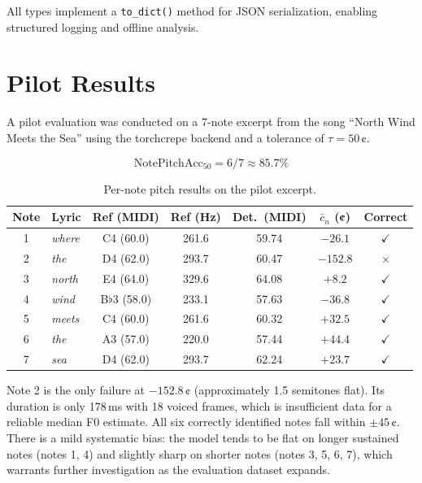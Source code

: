 \documentclass[11pt,letterpaper]{article}
\begin{document}
All types implement a \texttt{to\_dict()} method for JSON serialization,
enabling structured logging and offline analysis.

\section{Pilot Results}

A pilot evaluation was conducted on a 7-note excerpt from the song
``North Wind Meets the Sea'' using the torchcrepe backend and a
tolerance of $\tau = 50$\,¢.

\[
  \mathrm{NotePitchAcc}_{50} = 6/7 \approx 85.7\%
\]

\begin{table}[h]
  \centering
  \caption{Per-note pitch results on the pilot excerpt.}
  \renewcommand{\arraystretch}{1.2}
  \begin{tabular}{@{}clccccc@{}}
    \toprule
    Note & Lyric & Ref (MIDI) & Ref (Hz) & Det.\ (MIDI) & $\bar{c}_n$ (¢) & Correct \\
    \midrule
    1 & \textit{where} & C4 (60.0)  & 261.6 & 59.74 & $-26.1$  & $\checkmark$ \\
    2 & \textit{the}   & D4 (62.0)  & 293.7 & 60.47 & $-152.8$ & $\times$     \\
    3 & \textit{north} & E4 (64.0)  & 329.6 & 64.08 & $+8.2$   & $\checkmark$ \\
    4 & \textit{wind}  & B$\flat$3 (58.0) & 233.1 & 57.63 & $-36.8$ & $\checkmark$ \\
    5 & \textit{meets} & C4 (60.0)  & 261.6 & 60.32 & $+32.5$  & $\checkmark$ \\
    6 & \textit{the}   & A3 (57.0)  & 220.0 & 57.44 & $+44.4$  & $\checkmark$ \\
    7 & \textit{sea}   & D4 (62.0)  & 293.7 & 62.24 & $+23.7$  & $\checkmark$ \\
    \bottomrule
  \end{tabular}
\end{table}

Note 2 is the only failure at $-152.8$\,¢ (approximately 1.5 semitones flat).
Its duration is only 178\,ms with 18 voiced frames, which is insufficient
data for a reliable median F0 estimate.
All six correctly identified notes fall within $\pm 45$\,¢.
There is a mild systematic bias: the model tends to be flat on longer
sustained notes (notes 1, 4) and slightly sharp on shorter notes (notes 3,
5, 6, 7), which warrants further investigation as the evaluation dataset
expands.
\end{document}
